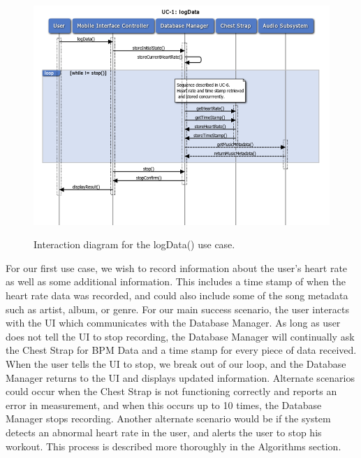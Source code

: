 \documentclass[letterpaper,english, 12pt]{scrreprt}
\begin{document}
\begin{figure}[H]
	\centering
	\includegraphics[scale=.78]{img/Interaction_Diagrams/UC1_logData.png}\\
	\caption {Interaction diagram for the logData() use case.} 
\end{figure}

For our first use case, we wish to record information about the user's heart rate as well as some additional information. This includes a time stamp of when the heart rate data was recorded, and could also include some of the song metadata such as artist, album, or genre. For our main success scenario, the user interacts with the UI which communicates with the Database Manager. As long as user does not tell the UI to stop recording, the Database Manager will continually ask the Chest Strap for BPM Data and a time stamp for every piece of data received. When the user tells the UI to stop, we break out of our loop, and the Database Manager returns to the UI and displays updated information. Alternate scenarios could occur when the Chest Strap is not functioning correctly and reports an error in measurement, and when this occurs up to 10 times, the Database Manager stops recording. Another alternate scenario would be if the system detects an abnormal heart rate in the user, and alerts the user to stop his workout. This process is described more thoroughly in the Algorithms section.
\end{document}
